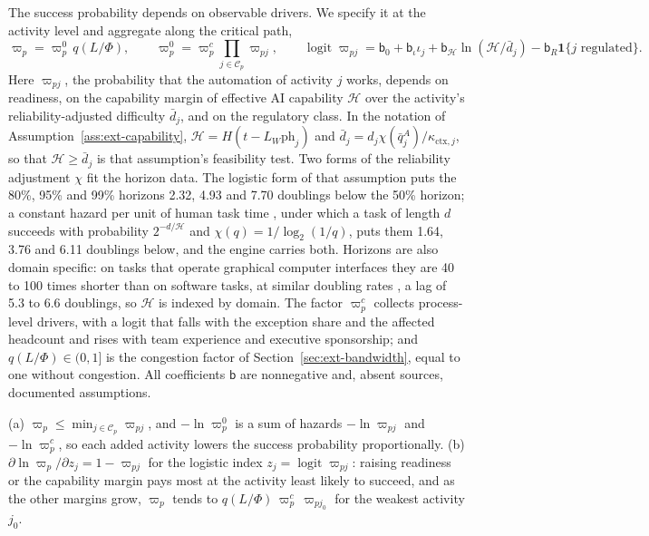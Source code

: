 The success probability depends on observable drivers. We specify it at the activity level and aggregate along the critical path,
\begin{equation}\label{eq:tasks-success}
\varpi_p=\varpi^0_p\,q(L/\Phi),\qquad\varpi^0_p=\varpi^c_p\prod_{j\in\mathcal C_p}\varpi_{pj},\qquad\operatorname{logit}\varpi_{pj}=\mathsf b_0+\mathsf b_\iota\iota_j+\mathsf b_{\mathcal H}\ln(\mathcal H/\bar d_j)-\mathsf b_R\mathbf 1\{j\text{ regulated}\}.
\end{equation}
Here $\varpi_{pj}$, the probability that the automation of activity $j$ works, depends on readiness, on the capability margin of effective AI capability $\mathcal H$ over the activity's reliability-adjusted difficulty $\bar d_j$, and on the regulatory class. In the notation of Assumption~\ref{ass:ext-capability}, $\mathcal H=H(t-L_W\mathrm{ph}_j)$ and $\bar d_j=d_j\chi(\bar q^A_j)/\kappa_{\mathrm{ctx},j}$, so that $\mathcal H\ge\bar d_j$ is that assumption's feasibility test. Two forms of the reliability adjustment $\chi$ fit the horizon data. The logistic form of that assumption puts the 80\%, 95\% and 99\% horizons 2.32, 4.93 and 7.70 doublings below the 50\% horizon; a constant hazard per unit of human task time \citep{ord2025is}, under which a task of length $d$ succeeds with probability $2^{-d/\mathcal H}$ and $\chi(q)=1/\log_2(1/q)$, puts them 1.64, 3.76 and 6.11 doublings below, and the engine carries both. Horizons are also domain specific: on tasks that operate graphical computer interfaces they are 40 to 100 times shorter than on software tasks, at similar doubling rates \citep{kwa2025how}, a lag of 5.3 to 6.6 doublings, so $\mathcal H$ is indexed by domain. The factor $\varpi^c_p$ collects process-level drivers, with a logit that falls with the exception share and the affected headcount and rises with team experience and executive sponsorship; and $q(L/\Phi)\in(0,1]$ is the congestion factor of Section~\ref{sec:ext-bandwidth}, equal to one without congestion. All coefficients $\mathsf b$ are nonnegative and, absent sources, documented assumptions.

\begin{lemma}\label{lem:tasks-success}
(a) $\varpi_p\le\min_{j\in\mathcal C_p}\varpi_{pj}$, and $-\ln\varpi^0_p$ is a sum of hazards $-\ln\varpi_{pj}$ and $-\ln\varpi^c_p$, so each added activity lowers the success probability proportionally. (b) $\partial\ln\varpi_p/\partial z_j=1-\varpi_{pj}$ for the logistic index $z_j=\operatorname{logit}\varpi_{pj}$: raising readiness or the capability margin pays most at the activity least likely to succeed, and as the other margins grow, $\varpi_p$ tends to $q(L/\Phi)\,\varpi^c_p\,\varpi_{pj_0}$ for the weakest activity $j_0$.
\end{lemma}

